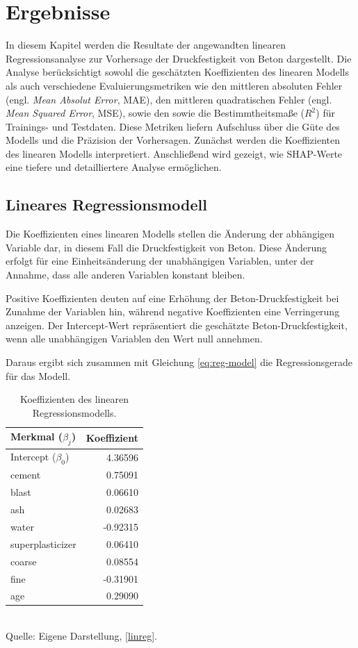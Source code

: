 \chapter{Ergebnisse}
\label{chapter:results}

In diesem Kapitel werden die Resultate der angewandten linearen Regressionsanalyse 
zur Vorhersage der Druckfestigkeit von Beton dargestellt. 
Die Analyse berücksichtigt sowohl die geschätzten Koeffizienten des linearen Modells 
als auch verschiedene Evaluierungsmetriken wie den mittleren absoluten Fehler (engl. \textit{Mean Absolut Error}, MAE), 
den mittleren quadratischen Fehler (engl. \textit{Mean Squared Error}, MSE), sowie den  sowie die Bestimmtheitsmaße ($R^2$) 
für Trainings- und Testdaten. Diese Metriken liefern Aufschluss über die Güte des Modells 
und die Präzision der Vorhersagen. Zunächst werden die Koeffizienten 
des linearen Modells interpretiert. Anschließend wird gezeigt, 
wie SHAP-Werte eine tiefere und detailliertere Analyse ermöglichen.

\section{Lineares Regressionsmodell}

Die Koeffizienten eines linearen Modells stellen die Änderung der abhängigen Variable dar, 
in diesem Fall die Druckfestigkeit von Beton. Diese Änderung erfolgt für eine Einheitsänderung der 
unabhängigen Variablen, unter der Annahme, dass alle anderen Variablen konstant bleiben.

Positive Koeffizienten deuten auf eine Erhöhung der Beton-Druckfestigkeit 
bei Zunahme der Variablen hin, während negative Koeffizienten eine Verringerung anzeigen. 
Der Intercept-Wert repräsentiert die geschätzte Beton-Druckfestigkeit, 
wenn alle unabhängigen Variablen den Wert null annehmen. 

Daraus ergibt sich zusammen mit Gleichung \ref{eq:reg-model} die Regressionsgerade für das Modell.

\begin{table}[!h]
    \caption{Koeffizienten des linearen Regressionsmodells.}
    \begin{tabularx}{\textwidth}{Xr}
    \toprule
    Merkmal ($\beta_j$) & Koeffizient \\
    \midrule
    Intercept ($\beta_0$) & 4.36596 \\
    cement & 0.75091 \\
    blast & 0.06610 \\
    ash & 0.02683 \\
    water & -0.92315 \\
    superplasticizer & 0.06410 \\
    coarse & 0.08554 \\
    fine &  -0.31901 \\
    age & 0.29090 \\
    \bottomrule
    \end{tabularx}
    \label{tab:model-coefficients}
    \\ Quelle: Eigene Darstellung, \ref{linreg}.
\end{table}


